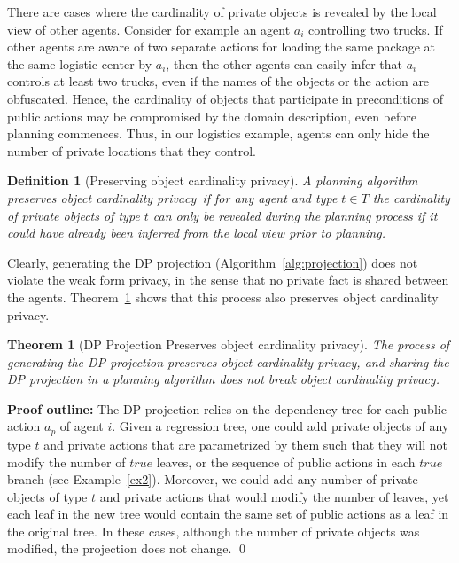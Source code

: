 \documentclass[letterpaper]{article}
\newcommand{\true}{\textit{true}}
\newtheorem{definition}{Definition}
\newtheorem{theorem}{Theorem}
\newcommand\cprivacy{object cardinality privacy}
\theoremstyle{definition}
\begin{document}
There are cases where the cardinality of private objects is revealed by the local view of other agents. Consider for example an agent $a_i$ controlling two trucks. If other agents are aware of two separate actions for loading the same package at the same logistic center by $a_i$, then the other agents can easily infer that $a_i$ controls at least two trucks, even if the names of the objects or the action are obfuscated. %
Hence, the cardinality of objects that participate in preconditions of public actions may be compromised by the domain description, even before planning commences. %
Thus, in our logistics example, agents can only hide the number of private locations that they control.


\begin{definition}[Preserving \cprivacy]
A planning algorithm preserves \cprivacy\ if for any agent and type $t\in T$ the cardinality of private objects of type $t$ can only be revealed during the planning process if it could have already been inferred from the local view prior to planning.
\label{def:cprivacy}
\end{definition}

Clearly, generating the DP projection (Algorithm~\ref{alg:projection}) does not violate the weak form privacy, in the sense that no private fact is shared between the agents. Theorem~\ref{the:dp-proof} shows that this process also preserves \cprivacy .
\begin{theorem}[DP Projection Preserves \cprivacy ]
The process of generating the DP projection preserves \cprivacy,
and sharing the DP projection in a planning algorithm does not break \cprivacy .
\label{the:dp-proof}
\end{theorem}
{\bf Proof outline:}
The DP projection relies on the dependency tree for each public action $a_p$ of agent $i$. Given a regression tree, one could add private objects of any type $t$ and private actions that are parametrized by them such that they will not modify the number of $\true$ leaves, or the sequence of public actions in each $\true$ branch (see Example~\ref{ex2}).
Moreover, we could add any number of private objects of type $t$ and private actions that would modify the number of leaves, yet each leaf in the new tree would contain the same set of public actions as a leaf in the original tree. In these cases, although the number of private objects was modified, the projection  does not change. \qed
\end{document}
